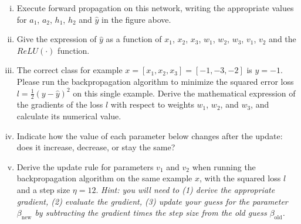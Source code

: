 \documentclass[11pt]{article}
\begin{document}
\begin{enumerate}
\begin{enumerate}[(i) ]
    \item Execute forward propagation on this network, writing the appropriate values for $a_1$, $a_2$, $h_1$, $h_2$ and $\hat{y}$ in the figure above.
    \item Give the expression of $\hat{y}$ as a function of $x_1$, $x_2$, $x_3$, $w_1$, $w_2$, $w_3$, $v_1$, $v_2$ and the $ReLU(\cdot)$ function.
    \item The correct class for example $x = [x_1, x_2, x_3] = [-1, -3, -2]$ is $y = -1$. Please run the backpropagation algorithm to minimize the squared error loss $l = \frac{1}{2}(y - \hat{y})^2$ on this single example. Derive the mathematical expression of the gradients of the loss $l$ with respect to weights $w_1$, $w_2$, and $w_3$, and calculate its numerical value.
    \item Indicate how the value of each parameter below changes after the update: does it increase, decrease, or stay the same?
    \item Derive the update rule for parameters $v_1$ and $v_2$ when running the backpropagation algorithm on the same example $x$, with the squared loss $l$ and a step size $\eta = {1}{2}$. \textit{Hint: you will need to (1) derive the appropriate gradient, (2) evaluate the gradient, (3) update your guess for the parameter $\beta_{\text{new}}$ by subtracting the gradient times the step size from the old guess $\beta_{\text{old}}$.}
\end{enumerate}

\begin{answertext}{22cm}{}


\end{answertext}
\end{enumerate}
\end{document}
